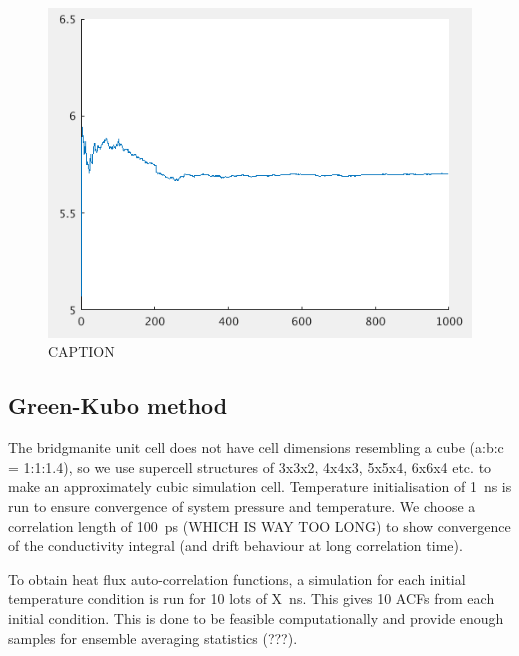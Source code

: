 \documentclass[%
preprint,                                  %
nofootinbib,
 amsmath,amssymb,
 aps,
]{revtex4-1}
\begin{document}
\begin{figure}[h!]
  \includegraphics[width=\linewidth]{images/kappa_conv.png}
  \caption{CAPTION}
  \label{fig:kappa_conv}
\end{figure}


















\subsection{\label{sec:method.gk}Green-Kubo method}

The bridgmanite unit cell does not have cell dimensions resembling a cube (a:b:c = 1:1:1.4), so we use supercell structures of 3x3x2, 4x4x3, 5x5x4, 6x6x4 etc. to make an approximately cubic simulation cell. Temperature initialisation of 1~ns is run to ensure convergence of system pressure and temperature. We choose a correlation length of 100~ps (WHICH IS WAY TOO LONG) to show convergence of the conductivity integral (and drift behaviour at long correlation time). 

To obtain heat flux auto-correlation functions, a simulation for each initial temperature condition is run for 10 lots of X~ns. This gives 10 ACFs from each initial condition. This is done to be feasible computationally and provide enough samples for ensemble averaging statistics (???).
\end{document}
